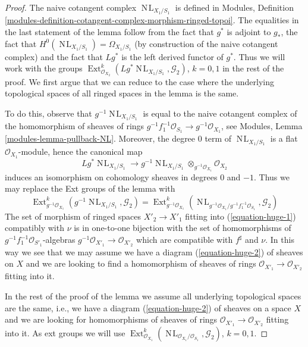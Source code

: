 \documentclass[10pt,a4paper]{amsart}
\theoremstyle{plain}
\theoremstyle{definition}
\theoremstyle{remark}
\numberwithin{equation}{subsection}
\def\Ext{\mathop{\mathrm{Ext}}\nolimits}
\def\NL{\mathop{N\!L}\nolimits}
\begin{document}
\begin{proof}
The naive cotangent complex $\NL_{X_1/S_1}$ is defined in Modules, Definition
\ref{modules-definition-cotangent-complex-morphism-ringed-topoi}.
The equalities in the last statement of the lemma follow from
the fact that $g^*$ is adjoint to $g_*$, the fact that
$H^0(\NL_{X_1/S_1}) = \Omega_{X_1/S_1}$ (by construction of the
naive cotangent complex) and the fact that $Lg^*$ is the left
derived functor of $g^*$. Thus we will work with the groups
$\Ext^k_{\mathcal{O}_{X_2}}(Lg^*\NL_{X_1/S_1}, \mathcal{G}_2)$,
$k = 0, 1$ in the rest of the proof. We first argue that we can reduce
to the case where the underlying topological spaces of all ringed
spaces in the lemma is the same.

\medskip\noindent
To do this, observe that $g^{-1}\NL_{X_1/S_1}$ is equal to the naive
cotangent complex of the homomorphism of sheaves of rings
$g^{-1}f_1^{-1}\mathcal{O}_{S_1} \to g^{-1}\mathcal{O}_{X_1}$, see
Modules, Lemma \ref{modules-lemma-pullback-NL}.
Moreover, the degree $0$ term of $\NL_{X_1/S_1}$ is a flat
$\mathcal{O}_{X_1}$-module, hence the canonical map
$$
Lg^*\NL_{X_1/S_1}
\longrightarrow
g^{-1}\NL_{X_1/S_1} \otimes_{g^{-1}\mathcal{O}_{X_1}} \mathcal{O}_{X_2}
$$
induces an isomorphism on cohomology sheaves in degrees $0$ and $-1$.
Thus we may replace the Ext groups of the lemma with
$$
\Ext^k_{g^{-1}\mathcal{O}_{X_1}}(g^{-1}\NL_{X_1/S_1}, \mathcal{G}_2) =
\Ext^k_{g^{-1}\mathcal{O}_{X_1}}(
\NL_{g^{-1}\mathcal{O}_{X_1}/g^{-1}f_1^{-1}\mathcal{O}_{S_1}}, \mathcal{G}_2)
$$
The set of morphism of ringed spaces $X'_2 \to X'_1$ fitting into
(\ref{equation-huge-1}) compatibly with $\nu$
is in one-to-one bijection with
the set of homomorphisms of $g^{-1}f_1^{-1}\mathcal{O}_{S'_1}$-algebras
$g^{-1}\mathcal{O}_{X'_1} \to \mathcal{O}_{X'_2}$ which are compatible with
$f^\sharp$ and $\nu$. In this way we see that we may assume we have a
diagram (\ref{equation-huge-2}) of sheaves on $X$ and we are looking to
find a homomorphism of sheaves of rings
$\mathcal{O}_{X'_1} \to \mathcal{O}_{X'_2}$ fitting into it.

\medskip\noindent
In the rest of the proof of the lemma we assume
all underlying topological spaces are the
same, i.e., we have a diagram (\ref{equation-huge-2}) of sheaves on
a space $X$ and we are looking for homomorphisms of sheaves of rings
$\mathcal{O}_{X'_1} \to \mathcal{O}_{X'_2}$ fitting into it.
As ext groups we will use
$\Ext^k_{\mathcal{O}_{X_1}}(
\NL_{\mathcal{O}_{X_1}/\mathcal{O}_{S_1}}, \mathcal{G}_2)$, $k = 0, 1$.


\end{proof}
\end{document}
